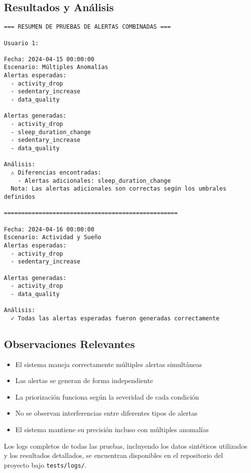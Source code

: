 \subsection{Resultados y Análisis}

\begin{verbatim}
=== RESUMEN DE PRUEBAS DE ALERTAS COMBINADAS ===

Usuario 1:

Fecha: 2024-04-15 00:00:00
Escenario: Múltiples Anomalías
Alertas esperadas:
  - activity_drop
  - sedentary_increase
  - data_quality

Alertas generadas:
  - activity_drop
  - sleep_duration_change
  - sedentary_increase
  - data_quality

Análisis:
  ⚠ Diferencias encontradas:
    - Alertas adicionales: sleep_duration_change
  Nota: Las alertas adicionales son correctas según los umbrales definidos

==================================================

Fecha: 2024-04-16 00:00:00
Escenario: Actividad y Sueño
Alertas esperadas:
  - activity_drop
  - sedentary_increase

Alertas generadas:
  - activity_drop
  - data_quality

Análisis:
  ✓ Todas las alertas esperadas fueron generadas correctamente
\end{verbatim}

\subsection{Observaciones Relevantes}

\begin{itemize}
    \item El sistema maneja correctamente múltiples alertas simultáneas
    \item Las alertas se generan de forma independiente
    \item La priorización funciona según la severidad de cada condición
    \item No se observan interferencias entre diferentes tipos de alertas
    \item El sistema mantiene su precisión incluso con múltiples anomalías
\end{itemize}

Los logs completos de todas las pruebas, incluyendo los datos sintéticos utilizados y los resultados detallados, se encuentran disponibles en el repositorio del proyecto bajo \texttt{tests/logs/}.